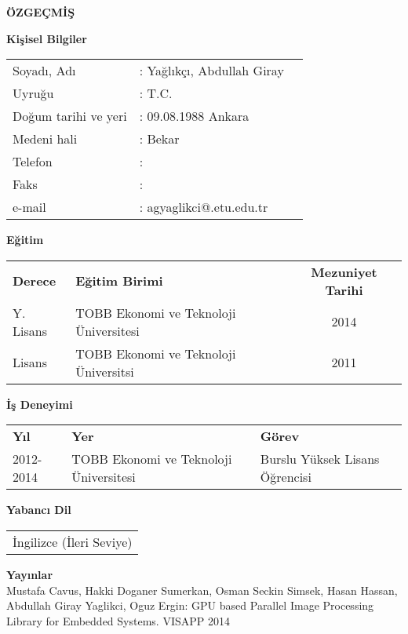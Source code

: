 \newpage
\pagestyle{plain}
\begin{center}
{\LARGE \bf \"OZGE\c{C}M\.{I}\c{S}}
\end{center}
\vspace{0.5cm}
{\bf Ki\c{s}isel Bilgiler}


\noindent
\begin{tabular}{@{}lll@{}}
Soyad{\i}, Ad{\i} & : Yağlıkçı, Abdullah Giray &\\
Uyru\u{g}u & : T.C.&\\
Do\u{g}um tarihi ve yeri & : 09.08.1988 Ankara&\\
Medeni hali & : Bekar& \\
Telefon & : &\\
Faks & : &\\
e-mail & : agyaglikci@.etu.edu.tr &\\
\end{tabular}

\vspace{0.5cm}
\noindent
{\bf E\u{g}itim}


\noindent
\begin{tabular}{@{}llc@{}}
{\bf Derece} & {\bf E\u{g}itim Birimi} & {\bf Mezuniyet Tarihi}\\
Y. Lisans & TOBB Ekonomi ve Teknoloji \"Universitesi & 2014\\
Lisans & TOBB Ekonomi ve Teknoloji \"Universitsi& 2011\\
\end{tabular}

\vspace{0.5cm}
\noindent
{\bf \.{I}\c{s} Deneyimi}


\noindent
\begin{tabular}{@{}lll@{}}
{\bf Y{\i}l} & {\bf Yer} & {\bf G\"orev}\\
2012-2014 & TOBB Ekonomi ve Teknoloji \"Universitesi & Burslu Yüksek Lisans Öğrencisi\\
\end{tabular}

\vspace{0.5cm}
\noindent
{\bf Yabanc{\i} Dil}


\noindent
\begin{tabular}{@{}l@{}}
\.{I}ngilizce (İleri Seviye)\\
\end{tabular}


\vspace{0.5cm}
\noindent
{\bf Yay{\i}nlar} \\
\noindent
Mustafa Cavus, Hakki Doganer Sumerkan, Osman Seckin Simsek, Hasan Hassan, Abdullah Giray Yaglikci, Oguz Ergin: GPU based Parallel Image Processing Library for Embedded Systems. VISAPP 2014
